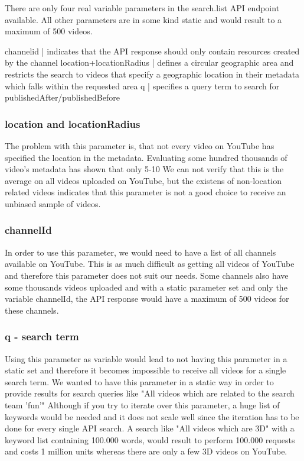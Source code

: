 There are only four real variable
parameters in the search.list API endpoint available. All other parameters are
in some kind static and would result to a maximum of 500 videos.

channelid | indicates that the API response should only contain resources created by the channel
location+locationRadius | defines a circular geographic area and restricts the search to videos that specify a geographic location in their metadata which falls within the requested area
q | specifies a query term to search for
publishedAfter/publishedBefore


\subsubsection{location and locationRadius}
The problem with this parameter is, that not every video on YouTube has specified the location in the metadata.
Evaluating some hundred thousands of video's metadata has shown that only 5-10%
We can not verify that this is the average on all videos uploaded on YouTube, but the existens of non-location related videos indicates that
this parameter is not a good choice to receive an unbiased sample of videos.

\subsubsection{channelId}
In order to use this parameter, we would need to have a list of all channels available on YouTube. This is as much difficult as
getting all videos of YouTube and therefore this parameter does not suit our needs. Some channels also have some thousands videos uploaded
and with a static parameter set and only the variable channelId, the API response would have a maximum of 500 videos for these channels.

\subsubsection{q - search term}
Using this parameter as variable would lead to not having this parameter in a static set and therefore it becomes impossible to receive
all videos for a single search term. We wanted to have this parameter in a static way in order to provide results
for search queries like "All videos which are related to the search team 'fun'"
Although if you try to iterate over this parameter, a huge list of keywords would be needed and it does not scale well since the iteration has
to be done for every single API search. A search like "All videos which are 3D" with a keyword list containing 100.000 words, would result to
perform 100.000 requests and costs 1 million units whereas there are only a few 3D videos on YouTube.

